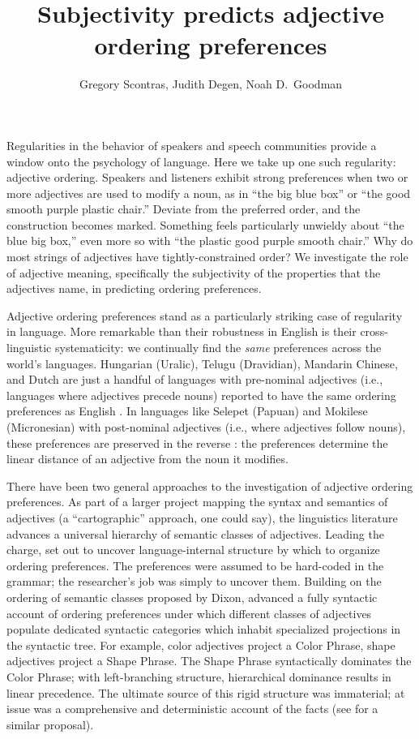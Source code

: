 \documentclass[12pt]{article}
\title{Subjectivity predicts adjective ordering preferences}
\author{Gregory Scontras, Judith Degen, Noah D.~Goodman}
\begin{document}
\maketitle

Regularities in the behavior of speakers and speech communities provide a window onto the psychology of language. Here we take up one such regularity: adjective ordering. Speakers and listeners exhibit strong preferences when two or more adjectives are used to modify a noun, as in ``the big blue box'' or ``the good smooth purple plastic chair.'' Deviate from the preferred order, and the construction becomes marked. Something feels particularly unwieldy about ``the blue big box,'' even more so with ``the plastic good purple smooth chair.'' 
Why do most strings of adjectives have tightly-constrained order? 
We investigate the role of adjective meaning, specifically the subjectivity of the properties that the adjectives name, in predicting ordering preferences.

Adjective ordering preferences stand as a particularly striking case of regularity in language. More remarkable than their robustness in English is their cross-linguistic systematicity: we continually find the \emph{same} preferences across the world's languages. Hungarian (Uralic), Telugu (Dravidian), Mandarin Chinese, and Dutch are just a handful of languages with pre-nominal adjectives (i.e., languages where adjectives precede nouns) reported to have the same ordering preferences as English \citep{Martin1969a,hetzron1978,dixon1982,Sproat1991,LaPolla2004}.  In languages like Selepet (Papuan) and Mokilese (Micronesian) with post-nominal adjectives (i.e., where adjectives follow nouns), these preferences are preserved in the reverse \citep{hetzron1978,dixon1982,Sproat1991}: the preferences determine the linear distance of an adjective from the noun it modifies.

There have been two general approaches to the investigation of adjective ordering preferences. 
As part of a larger project mapping the syntax and semantics of adjectives (a ``cartographic'' approach, one could say), the linguistics literature advances a universal hierarchy of semantic classes of adjectives. Leading the charge, \citet{dixon1982} set out to uncover language-internal structure by which to organize ordering preferences. The preferences were assumed to be hard-coded in the grammar; the researcher's job was simply to uncover them. 
Building on the ordering of semantic classes proposed by Dixon, \cite{Cinque1994} advanced a fully syntactic account of ordering preferences under which different classes of adjectives populate dedicated syntactic categories which inhabit specialized projections in the syntactic tree. For example, color adjectives project a Color Phrase, shape adjectives project a Shape Phrase. The Shape Phrase syntactically dominates the Color Phrase; with left-branching structure, hierarchical dominance results in linear precedence. The ultimate source of this rigid structure was immaterial; at issue was a comprehensive and deterministic account of the facts (see \citealp{scott2002} for a similar proposal). 
\end{document}
